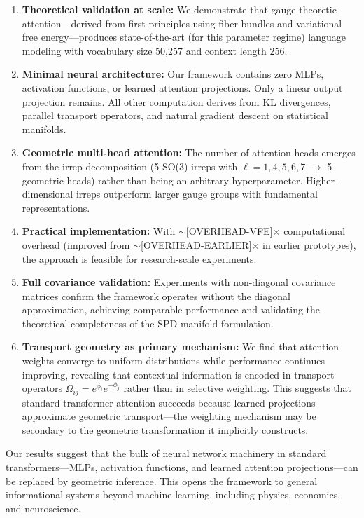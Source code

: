 \documentclass[twoside,11pt]{article}
\begin{document}
\begin{enumerate}
  \item \textbf{Theoretical validation at scale:} We demonstrate that gauge-theoretic attention---derived from first principles using fiber bundles and variational free energy---produces state-of-the-art (for this parameter regime) language modeling with vocabulary size 50,257 and context length 256.

  \item \textbf{Minimal neural architecture:} Our framework contains zero MLPs, activation functions, or learned attention projections. Only a linear output projection remains. All other computation derives from KL divergences, parallel transport operators, and natural gradient descent on statistical manifolds.

  \item \textbf{Geometric multi-head attention:} The number of attention heads emerges from the irrep decomposition (5 SO(3) irreps with $\ell=1,4,5,6,7$ $\rightarrow$ 5 geometric heads) rather than being an arbitrary hyperparameter. Higher-dimensional irreps outperform larger gauge groups with fundamental representations.

  \item \textbf{Practical implementation:} With $\sim$[OVERHEAD-VFE]$\times$ computational overhead (improved from $\sim$[OVERHEAD-EARLIER]$\times$ in earlier prototypes), the approach is feasible for research-scale experiments.

  \item \textbf{Full covariance validation:} Experiments with non-diagonal covariance matrices confirm the framework operates without the diagonal approximation, achieving comparable performance and validating the theoretical completeness of the SPD manifold formulation.

  \item \textbf{Transport geometry as primary mechanism:} We find that attention weights converge to uniform distributions while performance continues improving, revealing that contextual information is encoded in transport operators $\Omega_{ij} = e^{\phi_i}e^{-\phi_j}$ rather than in selective weighting. This suggests that standard transformer attention succeeds because learned projections approximate geometric transport---the weighting mechanism may be secondary to the geometric transformation it implicitly constructs.
\end{enumerate}

Our results suggest that the bulk of neural network machinery in standard transformers---MLPs, activation functions, and learned attention projections---can be replaced by geometric inference. This opens the framework to general informational systems beyond machine learning, including physics, economics, and neuroscience.
\end{document}
